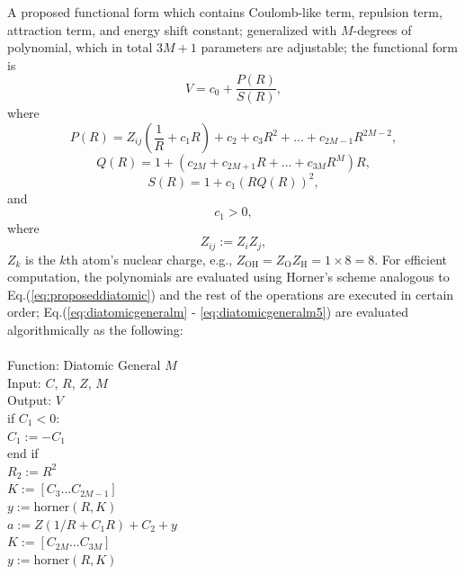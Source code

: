 \documentclass[12pt]{article}
\def\spc{\hspace*{0.5cm}} 			%
\begin{document}
A proposed functional form which contains Coulomb-like term, repulsion term, attraction term, and energy shift constant; generalized with $M$-degrees of polynomial, which in total $3M+1$ parameters are adjustable; the functional form is
\begin{equation}
    V = c_0 + \frac{P(R)}{S(R)},
    \label{eq:diatomicgeneralm}
\end{equation}
where
\begin{equation}
    P(R) = Z_{ij}\left(\frac{1}{R}+ c_1 R\right)+c_2+c_3 R^2+ ...+c_{2M-1}R^{2M-2},
    \label{eq:diatomicgeneralm2}
\end{equation}
\begin{equation}
    Q(R)=1+(c_{2M}+c_{2M+1} R +...+c_{3M} R^M)R,
    \label{eq:diatomicgeneralm3}
\end{equation}
\begin{equation}
    S(R)=1+c_1 (R Q(R))^2,
    \label{eq:diatomicgeneralm4}
\end{equation}
and
\begin{equation}
    c_1 > 0,
    \label{eq:diatomicgeneralm5}
\end{equation}
where  
\begin{equation}
    Z_{ij} := Z_iZ_j,
    \label{eq:diatomicgeneralm6}
\end{equation}
$Z_k$ is the $k$th atom's nuclear charge, e.g., $Z_{\text{OH}} = Z_{\text{O}}Z_{\text{H}} = 1 \times 8 = 8$. For efficient computation, the polynomials are evaluated using Horner's scheme analogous to Eq.(\ref{eq:proposeddiatomic}) and the rest of the operations are executed in certain order; Eq.(\ref{eq:diatomicgeneralm} - \ref{eq:diatomicgeneralm5}) are evaluated algorithmically as the following:
\\
\\
Function: Diatomic General $M$\\
Input: $C$, $R$, $Z$, $M$\\
Output: $V$ \\
if $C_1 < 0$: \\
\spc $C_1 := -C_1$ \\
end if \\
$R_2 := R^2$ \\
$K := [C_3 ... C_{2M-1}]$\\
$y := \text{horner}(R, K)$\\
$a := Z(1/R + C_1R) + C_2 + y$\\
$K := [C_{2M} ... C_{3M}]$\\
$y := \text{horner}(R, K)$\\
\end{document}
